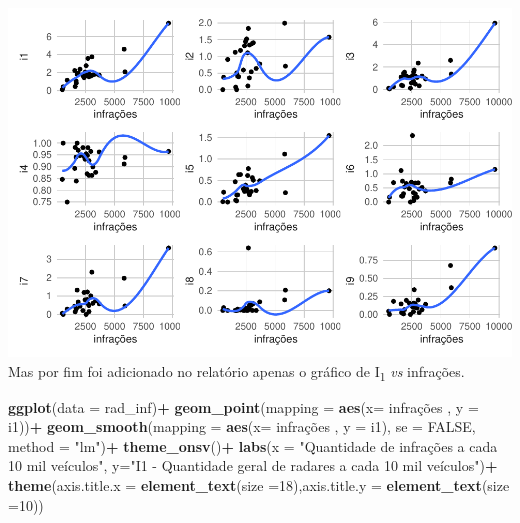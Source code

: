 \documentclass[
]{book}
\newenvironment{Shaded}{\begin{snugshade}}{\end{snugshade}}
\newcommand{\AttributeTok}[1]{\textcolor[rgb]{0.13,0.29,0.53}{#1}}
\newcommand{\ConstantTok}[1]{\textcolor[rgb]{0.56,0.35,0.01}{#1}}
\newcommand{\DecValTok}[1]{\textcolor[rgb]{0.00,0.00,0.81}{#1}}
\newcommand{\FunctionTok}[1]{\textcolor[rgb]{0.13,0.29,0.53}{\textbf{#1}}}
\newcommand{\NormalTok}[1]{#1}
\newcommand{\SpecialCharTok}[1]{\textcolor[rgb]{0.81,0.36,0.00}{\textbf{#1}}}
\newcommand{\StringTok}[1]{\textcolor[rgb]{0.31,0.60,0.02}{#1}}
\begin{document}
\includegraphics{_main_files/figure-latex/unnamed-chunk-23-1.pdf}
Mas por fim foi adicionado no relatório apenas o gráfico de I\textsubscript{1} \emph{vs} infrações.

\begin{Shaded}
\begin{Highlighting}[]
\FunctionTok{ggplot}\NormalTok{(}\AttributeTok{data =}\NormalTok{ rad\_inf)}\SpecialCharTok{+}
  \FunctionTok{geom\_point}\NormalTok{(}\AttributeTok{mapping =} \FunctionTok{aes}\NormalTok{(}\AttributeTok{x=}\NormalTok{ infrações , }\AttributeTok{y =}\NormalTok{ i1))}\SpecialCharTok{+}
  \FunctionTok{geom\_smooth}\NormalTok{(}\AttributeTok{mapping =} \FunctionTok{aes}\NormalTok{(}\AttributeTok{x=}\NormalTok{ infrações , }\AttributeTok{y =}\NormalTok{ i1), }\AttributeTok{se =} \ConstantTok{FALSE}\NormalTok{, }\AttributeTok{method =} \StringTok{"lm"}\NormalTok{)}\SpecialCharTok{+}
  \FunctionTok{theme\_onsv}\NormalTok{()}\SpecialCharTok{+}
  \FunctionTok{labs}\NormalTok{(}\AttributeTok{x =} \StringTok{"Quantidade de infrações a cada 10 mil veículos"}\NormalTok{, }\AttributeTok{y=}\StringTok{"I1 {-} Quantidade geral de radares a cada 10 mil veículos"}\NormalTok{)}\SpecialCharTok{+}
  \FunctionTok{theme}\NormalTok{(}\AttributeTok{axis.title.x =} \FunctionTok{element\_text}\NormalTok{(}\AttributeTok{size =}\DecValTok{18}\NormalTok{),}\AttributeTok{axis.title.y =} \FunctionTok{element\_text}\NormalTok{(}\AttributeTok{size =}\DecValTok{10}\NormalTok{))}
\end{Highlighting}
\end{Shaded}
\end{document}
